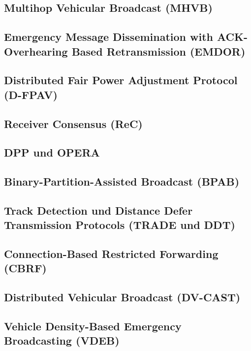 \documentclass[english,runningheads,a4paper]{llncs}[2018/03/10]
\begin{document}
\subsection{Multihop Vehicular Broadcast (MHVB)}

\subsection{Emergency Message Dissemination with ACK-Overhearing Based Retransmission (EMDOR)}

\subsection{Distributed Fair Power Adjustment Protocol (D-FPAV)}

\subsection{Receiver Consensus (ReC)}

\subsection{DPP und OPERA}

\subsection{Binary-Partition-Assisted Broadcast (BPAB)}

\subsection{Track Detection und Distance Defer Transmission Protocols (TRADE und DDT)}

\subsection{Connection-Based Restricted Forwarding (CBRF)}

\subsection{Distributed Vehicular Broadcast (DV-CAST)}

\subsection{Vehicle Density-Based Emergency Broadcasting (VDEB)}
\end{document}
